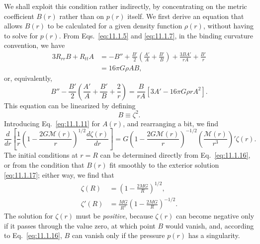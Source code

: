 We shall exploit this condition rather indirectly, by concentrating on the
metric coefficient \(B(r)\) rather than on \(p(r)\) itself. We first derive
an equation that allows \(B(r)\) to be calculated for a given density
function \(\rho(r)\), without having to solve for \(p(r)\). From
Eqs.~\eqref{eq:11.1.5} and \eqref{eq:11.1.7}, in the binding curvature
convention, we have
\[
  \begin{aligned}
  3R_{rr}B+R_{tt}A
  &=
  -B''
  +\frac{B'}2\left(\frac{A'}A+\frac{B'}B\right)
  +\frac{3BA'}{rA}+\frac{B'}r\\
  &=
  16\pi G\rho AB,
  \end{aligned}
\]
or, equivalently,
\[
  B''
  -\frac{B'}2
  \left(\frac{A'}A+\frac{B'}B+\frac2r\right)
  =
  \frac{B}{rA}\left[3A'-16\pi G\rho rA^2\right].
\]
This equation can be linearized by defining
\begin{equation}
  B\equiv\zeta^2.
  \tag{11.6.13}\label{eq:11.6.13}
\end{equation}
Introducing Eq.~\eqref{eq:11.1.11} for \(A(r)\), and rearranging a bit, we
find
\begin{equation}
  \frac{d}{dr}
  \left[
    \frac1r
    \left(1-\frac{2G\mathcal{M}(r)}r\right)^{1/2}
    \frac{d\zeta(r)}{dr}
  \right]
  =
  G
  \left(1-\frac{2G\mathcal{M}(r)}r\right)^{-1/2}
  \left(\frac{\mathcal{M}(r)}{r^3}\right)'
  \zeta(r).
  \tag{11.6.14}\label{eq:11.6.14}
\end{equation}
The initial conditions at \(r=R\) can be determined directly from
Eq.~\eqref{eq:11.1.16}, or from the condition that \(B(r)\) fit smoothly to
the exterior solution \eqref{eq:11.1.17}; either way, we find that
\begin{align}
  \zeta(R)
  &=
  \left(1-\frac{2MG}{R}\right)^{1/2},
  \tag{11.6.15}\label{eq:11.6.15}\\
  \zeta'(R)
  &=
  \frac{MG}{R^2}
  \left(1-\frac{2MG}{R}\right)^{-1/2}.
  \tag{11.6.16}\label{eq:11.6.16}
\end{align}
The solution for \(\zeta(r)\) must be \emph{positive}, because \(\zeta(r)\)
can become negative only if it passes through the value zero, at which point
\(B\) would vanish, and, according to Eq.~\eqref{eq:11.1.16}, \(B\) can
vanish only if the pressure \(p(r)\) has a singularity.

